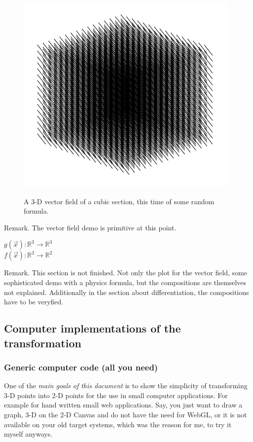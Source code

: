 \documentclass[a4paper]{article}
\begin{document}
\begin{figure}
\includegraphics[scale=0.5]{vectorfield.png}
\label{vector_field_image}
\caption{A 3-D vector field of a cubic section, this time of some random formula.}
\end{figure}

Remark. The vector field demo is primitive at this point.

\begin{center}
$g(\vec{x}) : \mathbb{R}^{3} \rightarrow \mathbb{R}^{3}$\\
$f(\vec{x}) : \mathbb{R}^{3} \rightarrow \mathbb{R}^{2}$\\
\end{center}


Remark. This section is not finished. Not only the plot for the vector field, some sophisticated demo with a physics formula, but the compositions are themselves not explained. Additionally in the section about differentiation, the compositions have to be veryfied.\\


\subsection{Computer implementations of the transformation}
\subsubsection{Generic computer code (all you need)}

One of the \emph{main goals of this document} is to show the simplicity of transforming 3-D points into 2-D points for the use in small computer applications. For example for hand written small web applications. Say, you just want to draw a graph, 3-D on the 
2-D Canvas and do not have the need for WebGL, or it is not available on your old target systems, which was the reason for me, to try it myself anyways.\\
\end{document}
